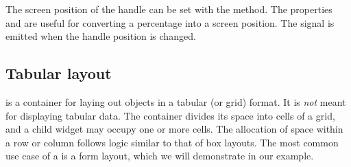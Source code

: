The screen position of the handle can be set with the
 method.  The properties
 and  are useful for converting
a percentage into a screen position. The  signal
is emitted when the handle position is changed.

\subsection{Tabular layout}
\label{sec:RGtk2:gtkTable}

 is a container for laying out objects in a tabular
(or grid) format. It is \emph{not} meant for displaying tabular
data. The container divides its space into cells of a grid, and a
child widget may occupy one or more cells. The allocation of space
within a row or column follows logic similar to that of box
layouts. The most common use case of a  is a form
layout, which we will demonstrate in our example.

